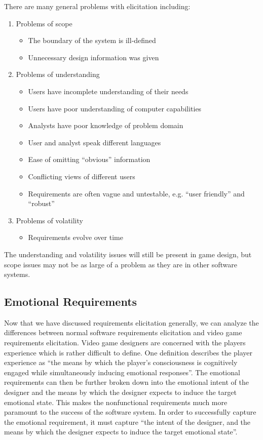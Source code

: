 There are many general problems with elicitation including\cite{mcdermid1989requirements}:
\begin{enumerate}
	\item Problems of scope
	\begin{itemize}
		\item The boundary of the system is ill-defined
		\item Unnecessary design information was given
	\end{itemize}
	\item Problems of understanding
	\begin{itemize}
		\item Users have incomplete understanding of their needs
		\item Users have poor understanding of computer capabilities
		\item Analysts have poor knowledge of problem domain
		\item User and analyst speak different languages
		\item Ease of omitting ``obvious'' information
		\item Conflicting views of different users
		\item Requirements are often vague and untestable, e.g. ``user friendly'' and ``robust''
	\end{itemize}
	\item Problems of volatility
	\begin{itemize}
		\item Requirements evolve over time
	\end{itemize}
\end{enumerate}
The understanding and volatility issues will still be present in game design, but scope issues may not be as large of a problem as they are in other software systems.

\subsection{Emotional Requirements}

Now that we have discussed requirements elicitation generally, we can analyze the differences between normal software requirements elicitation and video game requirements elicitation. Video game designers are concerned with the players experience which is rather difficult to define. One definition\cite{callele2006emotional} describes the player experience as ``the means by which the player's consciousness is cognitively engaged while simultaneously inducing emotional responses''. The emotional requirements can then be further broken down into the emotional intent of the designer and the means by which the designer expects to induce the target emotional state\cite{callele2006emotional}. This makes the nonfunctional requirements much more paramount to the success of the software system. In order to successfully capture the emotional requirement, it must capture\cite{callele2006emotional} ``the intent of the designer, and the means by which the designer expects to induce the target emotional state''.

